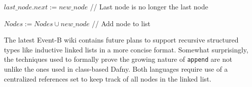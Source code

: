 \documentclass{article}
\begin{document}
\begin{center}
{{            \hspace{4em}$last\_node.next := new\_node$ // Last node is no longer the last node

            \hspace{4em}$Nodes := Nodes \cup new\_node$ // Add node to list


        }
    }
\end{center}
The latest Event-B wiki \cite{eventB} contains future plans to support recursive structured types like inductive linked lists
in a more concise format. Somewhat surprisingly, the techniques used to formally prove the growing nature of \texttt{append}
are not unlike the ones used in class-based Dafny. Both languages require use of a centralized references set to
keep track of all nodes in the linked list.

\end{document}
